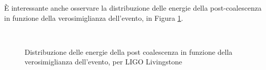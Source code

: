 È interessante anche osservare la distribuzione delle energie della post-coalescenza in funzione della verosimiglianza dell'evento, in Figura \ref{fig:likelihood}.
\begin{figure}[ht]
	\vspace{-15pt}
	\centering
	\\
	\caption{Distribuzione delle energie della post coalescenza in funzione della verosimiglianza dell'evento, per LIGO Livingstone}
	\label{fig:likelihood}
\end{figure}
